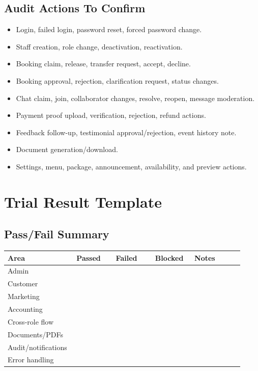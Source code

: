 \documentclass[11pt,a4paper]{article}
\begin{document}
\subsection{Audit Actions To Confirm}
\begin{itemize}
  \item Login, failed login, password reset, forced password change.
  \item Staff creation, role change, deactivation, reactivation.
  \item Booking claim, release, transfer request, accept, decline.
  \item Booking approval, rejection, clarification request, status changes.
  \item Chat claim, join, collaborator changes, resolve, reopen, message moderation.
  \item Payment proof upload, verification, rejection, refund actions.
  \item Feedback follow-up, testimonial approval/rejection, event history note.
  \item Document generation/download.
  \item Settings, menu, package, announcement, availability, and preview actions.
\end{itemize}

\newpage

\section{Trial Result Template}
\subsection{Pass/Fail Summary}
\begin{longtable}{p{0.24\linewidth}p{0.16\linewidth}p{0.16\linewidth}p{0.16\linewidth}p{0.2\linewidth}}
\toprule
\textbf{Area} & \textbf{Passed} & \textbf{Failed} & \textbf{Blocked} & \textbf{Notes} \\
\midrule
Admin & & & & \\
Customer & & & & \\
Marketing & & & & \\
Accounting & & & & \\
Cross-role flow & & & & \\
Documents/PDFs & & & & \\
Audit/notifications & & & & \\
Error handling & & & & \\
\bottomrule
\end{longtable}
\end{document}

